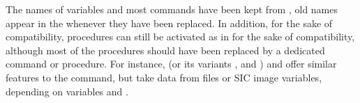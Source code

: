 The names of variables and most commands have been kept from 
\mapping{}, old names appear in the  whenever they have been 
replaced. In addition, for the sake of compatibility, \sic{} procedures 
can still be activated as in \mapping{} for the sake of compatibility, 
although most of the  procedures should have been replaced by a 
dedicated \imager{} command or procedure. For instance,   
(or its variants ,  and ) and 
 offer 
similar features to the  command, but take data from files or 
SIC image variables, depending on variables  and . 


%
